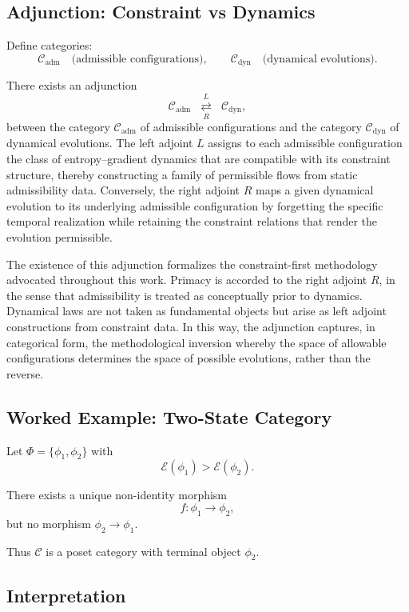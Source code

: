 \documentclass[11pt]{article}
\begin{document}
\subsection*{Adjunction: Constraint vs Dynamics}

Define categories:
\[
\mathcal{C}_{\text{adm}} \quad \text{(admissible configurations)},
\qquad
\mathcal{C}_{\text{dyn}} \quad \text{(dynamical evolutions)}.
\]

There exists an adjunction
\[
\mathcal{C}_{\mathrm{adm}}
\;\;\overset{L}{\underset{R}{\rightleftarrows}}\;\;
\mathcal{C}_{\mathrm{dyn}},
\]
between the category $\mathcal{C}_{\mathrm{adm}}$ of admissible configurations and the category $\mathcal{C}_{\mathrm{dyn}}$ of dynamical evolutions. The left adjoint $L$ assigns to each admissible configuration the class of entropy–gradient dynamics that are compatible with its constraint structure, thereby constructing a family of permissible flows from static admissibility data. Conversely, the right adjoint $R$ maps a given dynamical evolution to its underlying admissible configuration by forgetting the specific temporal realization while retaining the constraint relations that render the evolution permissible.

The existence of this adjunction formalizes the constraint-first methodology advocated throughout this work. Primacy is accorded to the right adjoint $R$, in the sense that admissibility is treated as conceptually prior to dynamics. Dynamical laws are not taken as fundamental objects but arise as left adjoint constructions from constraint data. In this way, the adjunction captures, in categorical form, the methodological inversion whereby the space of allowable configurations determines the space of possible evolutions, rather than the reverse.


\subsection*{Worked Example: Two-State Category}

Let $\Phi=\{\phi_1,\phi_2\}$ with
\[
\mathcal{E}(\phi_1) > \mathcal{E}(\phi_2).
\]

There exists a unique non-identity morphism
\[
f:\phi_1\to\phi_2,
\]
but no morphism $\phi_2\to\phi_1$.

Thus $\mathcal{C}$ is a poset category with terminal object $\phi_2$.

\subsection*{Interpretation}
\end{document}
